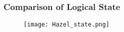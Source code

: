 



\subsubsection{Comparison of Logical State}
\label{sec:sched-spec-state-comparison}

\begin{figure}[ht]
  \texttt{[image: Hazel\_state.png]}
\end{figure}

